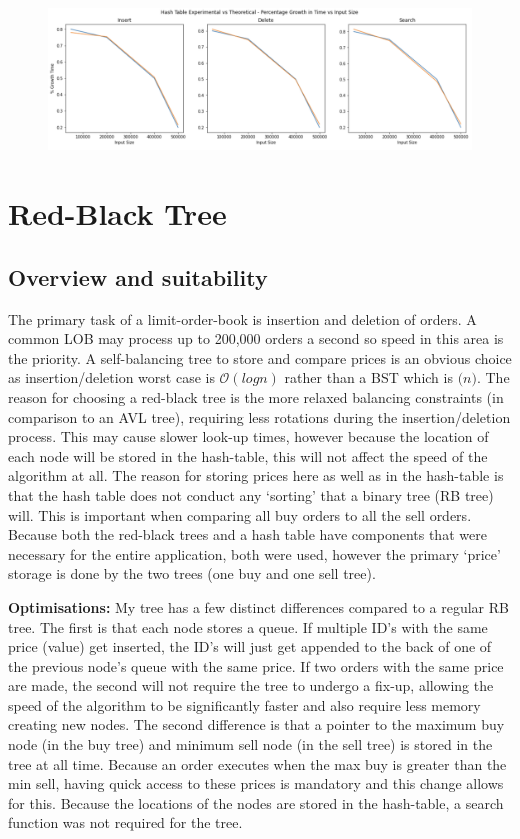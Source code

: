 \documentclass[11p]{article}
\def\nl{\newline}
\begin{document}
\begin{figure}[hbt!]
	\centering
	\includegraphics[width=0.9\linewidth]{experimental_results/htablecomp.png}
\end{figure}

\pagebreak

\section{Red-Black Tree}
\subsection{Overview and suitability}
The primary task of a limit-order-book is insertion and deletion of orders. A common LOB may process up to 200,000 orders a second so speed in this area is the priority. A self-balancing tree to store and compare prices is an obvious choice as insertion/deletion worst case is $\mathcal{O}(logn)$ rather than a BST which is $\mathcal(n)$. The reason for choosing a red-black tree is the more relaxed balancing constraints (in comparison to an AVL tree), requiring less rotations during the insertion/deletion process. This may cause slower look-up times, however because the location of each node will be stored in the hash-table, this will not affect the speed of the algorithm at all. The reason for storing prices here as well as in the hash-table is that the hash table does not conduct any `sorting' that a binary tree (RB tree) will. This is important when comparing all buy orders to all the sell orders. Because both the red-black trees and a hash table have components that were necessary for the entire application, both were used, however the primary `price' storage is done by the two trees (one buy and one sell tree). 



\textbf{Optimisations:} \nl
My tree has a few distinct differences compared to a regular RB tree. The first is that  each node stores a queue. If multiple ID's with the same price (value) get inserted, the ID's will just get appended to the back of one of the previous node's queue with the same price. If two orders with the same price are made, the second will not require the tree to undergo a fix-up, allowing the speed of the algorithm to be significantly faster and also require less memory creating new nodes. The second difference is that a pointer to the maximum buy node (in the buy tree) and minimum sell node (in the sell tree) is stored in the tree at all time. Because an order executes when the max buy is greater than the min sell, having quick access to these prices is mandatory and this change allows for this. Because the locations of the nodes are stored in the hash-table, a search function was not required for the tree.
\end{document}
